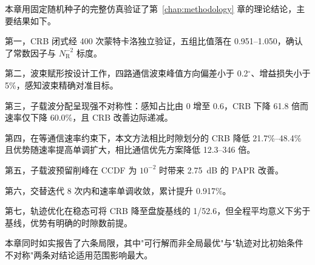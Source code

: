 本章用固定随机种子的完整仿真验证了第~\ref{chap:methodology} 章的理论结论，主要结果如下。

第一，CRB 闭式经 400 次蒙特卡洛独立验证，五组比值落在 0.951--1.050，确认了常数因子与 $N_{\mathrm{R}}^{-2}$ 标度。

第二，波束赋形按设计工作，四路通信波束峰值方向偏差小于 0.2$^{\circ}$、增益损失小于 5\%，感知波束精确对准目标。

第三，子载波分配呈现强不对称性：感知占比由 0 增至 0.6，CRB 下降 61.8 倍而速率仅下降 60.0\%，且 CRB 改善边际递减。

第四，在等通信速率约束下，本文方法相比时隙划分的 CRB 降低 21.7\%--48.4\% 且优势随速率提高单调扩大，相比通信优先方案降低 12.3--346 倍。

第五，子载波预留削峰在 CCDF 为 $10^{-2}$ 时带来 2.75~dB 的 PAPR 改善。

第六，交替迭代 8 次内和速率单调收敛，累计提升 0.917\%。

第七，轨迹优化在稳态可将 CRB 降至盘旋基线的 1/52.6，但全程平均意义下劣于基线，优势有明确的时隙数前提。

本章同时如实报告了六条局限，其中"可行解而非全局最优"与"轨迹对比初始条件不对称"两条对结论适用范围影响最大。
